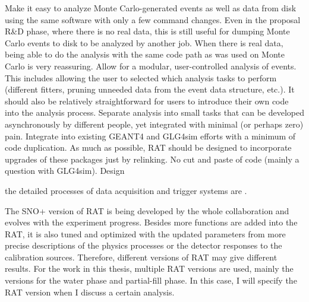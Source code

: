 Make it easy to analyze Monte Carlo-generated events as well as data from disk using the same software with only a few command changes. Even in the proposal R\&D phase, where there is no real data, this is still useful for dumping Monte Carlo events to disk to be analyzed by another job. When there is real data, being able to do the analysis with the same code path as was used on Monte Carlo is very reassuring.
Allow for a modular, user-controlled analysis of events. This includes allowing the user to selected which analysis tasks to perform (different fitters, pruning unneeded data from the event data structure, etc.). It should also be relatively straightforward for users to introduce their own code into the analysis process.
Separate analysis into small tasks that can be developed asynchronously by different people, yet integrated with minimal (or perhaps zero) pain.
Integrate into existing GEANT4 and GLG4sim efforts with a minimum of code duplication. As much as possible, RAT should be designed to incorporate upgrades of these packages just by relinking. No cut and paste of code (mainly a question with GLG4sim).
Design

the detailed processes of data acquisition and trigger systems are \cite{whitepaper}.

The SNO+ version of RAT is being developed by the whole collaboration and evolves with the experiment progress.
Besides more functions are added into the RAT, it is also tuned and optimized with the updated parameters from more precise descriptions of the physics processes or the detector responses to the calibration sources. Therefore, different versions of RAT may give different results. For the work in this thesis, multiple RAT versions are used, mainly the versions for the water phase and partial-fill phase. In this case, I will specify the RAT version when I discuss a certain analysis.
\cite{ratManual}


